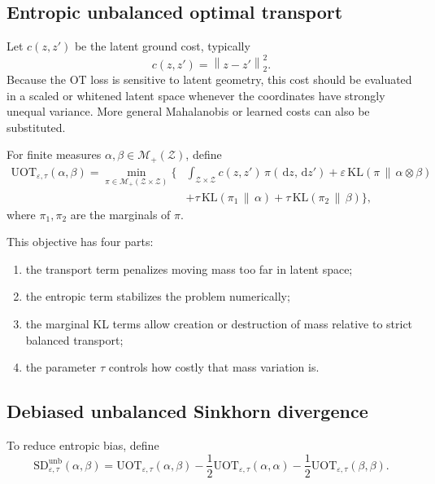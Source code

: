 \documentclass[11pt]{article}
\newcommand{\dd}{\,\mathrm{d}}
\newcommand{\KL}{\mathrm{KL}}
\newcommand{\UOT}{\mathrm{UOT}}
\newcommand{\SDunb}{\mathrm{SD}^{\mathrm{unb}}}
\newcommand{\Zcal}{\mathcal{Z}}
\newcommand{\Mplus}{\mathcal{M}_{+}}
\newcommand{\norm}[1]{\left\lVert #1 \right\rVert}
\begin{document}
\subsection{Entropic unbalanced optimal transport}

Let $c(z,z')$ be the latent ground cost, typically
\[
c(z,z')=\norm{z-z'}_2^2.
\]
Because the OT loss is sensitive to latent geometry, this cost should be evaluated in a scaled or whitened latent space whenever the coordinates have strongly unequal variance. More general Mahalanobis or learned costs can also be substituted.

For finite measures $\alpha,\beta\in\Mplus(\Zcal)$, define
\begin{equation}
\begin{aligned}
\UOT_{\varepsilon,\tau}(\alpha,\beta)
=
\min_{\pi\in\Mplus(\Zcal\times\Zcal)}
\Bigg\{&
\int_{\Zcal\times\Zcal}c(z,z')\,\pi(\dd z,\dd z')
+
\varepsilon\,\KL(\pi\,\|\,\alpha\otimes\beta)
\\
&+
\tau\,\KL(\pi_1\,\|\,\alpha)
+
\tau\,\KL(\pi_2\,\|\,\beta)
\Bigg\},
\end{aligned}
\label{eq:uot_def}
\end{equation}
where $\pi_1,\pi_2$ are the marginals of $\pi$.

This objective has four parts:
\begin{enumerate}[label=(\roman*),leftmargin=2.2em]
    \item the transport term penalizes moving mass too far in latent space;
    \item the entropic term stabilizes the problem numerically;
    \item the marginal KL terms allow creation or destruction of mass relative to strict balanced transport;
    \item the parameter $\tau$ controls how costly that mass variation is.
\end{enumerate}

\subsection{Debiased unbalanced Sinkhorn divergence}

To reduce entropic bias, define
\begin{equation}
\SDunb_{\varepsilon,\tau}(\alpha,\beta)
=
\UOT_{\varepsilon,\tau}(\alpha,\beta)
-
\frac{1}{2}\UOT_{\varepsilon,\tau}(\alpha,\alpha)
-
\frac{1}{2}\UOT_{\varepsilon,\tau}(\beta,\beta).
\label{eq:unbalanced_sinkhorn}
\end{equation}
\end{document}
